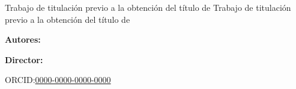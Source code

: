\vspace{1.2\baselineskip}%

\begin{espaciosimple}%
    \begin{flushright}
        \begin{minipage}{5.8cm}
            {\fontsize{11}{11}\selectfont Trabajo de titulación previo a la obtención del título de Trabajo de titulación previo a la obtención del título de} %
        \end{minipage}
    \end{flushright}
    
    \vspace{.5\baselineskip}%
    
    \hphantom{Hola!}%

    \hphantom{Hola!}%

    \begin{flushleft}
        {\fontsize{11}{13}\selectfont \textbf{Autores:}} %
       
        {\fontsize{11}{13}\selectfont {Nombres y Apellidos completos del Autor A}} %
        
        {\fontsize{11}{13}\selectfont {Nombres y Apellidos completos del Autor B}} %

        \hphantom{Hola!}%

        {\fontsize{11}{13}\selectfont \textbf{Director:}} %
       
        {\fontsize{11}{13}\selectfont {Nombre del tutor}} %
        
        \item{ORCID:}\href{https://orcid.org}{\hspace{1mm}0000-0000-0000-0000} %
    \end{flushleft}


\end{espaciosimple}
